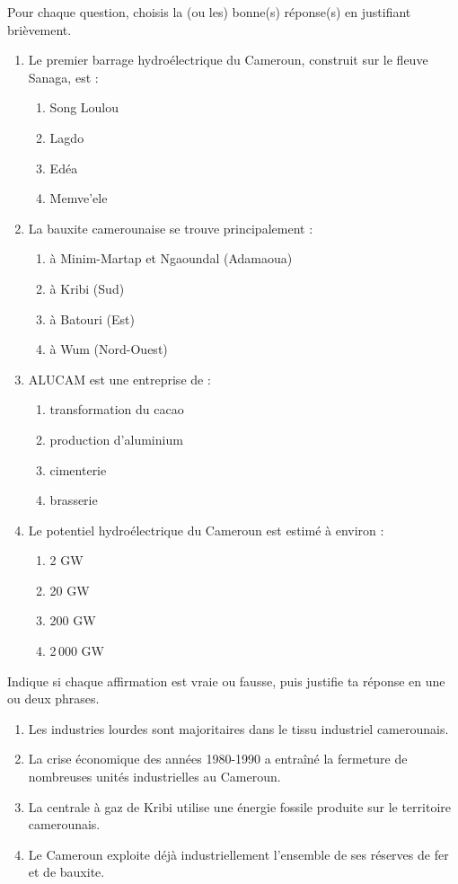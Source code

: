 \documentclass[11pt]{article}
\begin{document}
\begin{exercice}
Pour chaque question, choisis la (ou les) bonne(s) réponse(s) en justifiant brièvement.
\begin{enumerate}
\item Le premier barrage hydroélectrique du Cameroun, construit sur le fleuve Sanaga, est :
\begin{enumerate}
\item Song Loulou \item Lagdo \item Edéa \item Memve'ele
\end{enumerate}
\item La bauxite camerounaise se trouve principalement :
\begin{enumerate}
\item à Minim-Martap et Ngaoundal (Adamaoua) \item à Kribi (Sud) \item à Batouri (Est) \item à Wum (Nord-Ouest)
\end{enumerate}
\item ALUCAM est une entreprise de :
\begin{enumerate}
\item transformation du cacao \item production d'aluminium \item cimenterie \item brasserie
\end{enumerate}
\item Le potentiel hydroélectrique du Cameroun est estimé à environ :
\begin{enumerate}
\item 2 GW \item 20 GW \item 200 GW \item 2\,000 GW
\end{enumerate}
\end{enumerate}
\end{exercice}

\begin{exercice}
Indique si chaque affirmation est vraie ou fausse, puis justifie ta réponse en une ou deux phrases.
\begin{enumerate}
\item Les industries lourdes sont majoritaires dans le tissu industriel camerounais.
\item La crise économique des années 1980-1990 a entraîné la fermeture de nombreuses unités industrielles au Cameroun.
\item La centrale à gaz de Kribi utilise une énergie fossile produite sur le territoire camerounais.
\item Le Cameroun exploite déjà industriellement l'ensemble de ses réserves de fer et de bauxite.
\end{enumerate}
\end{exercice}
\end{document}
